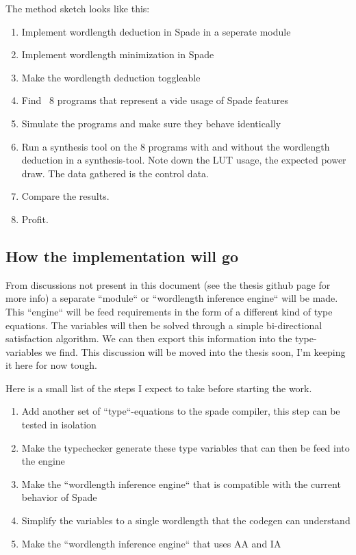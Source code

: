 \documentclass[msc,lith,english]{liuthesis}
\begin{document}
The method sketch looks like this:
\begin{enumerate}
  \item Implement wordlength deduction in Spade in a seperate module
  \item Implement wordlength minimization in Spade
  \item Make the wordlength deduction toggleable
  \item Find ~8 programs that represent a vide usage of Spade features
  \item Simulate the programs and make sure they behave identically
  \item Run a synthesis tool on the 8 programs with and without the wordlength deduction in a synthesis-tool. Note down the LUT usage, the expected power draw. The data gathered is the control data.
  \item Compare the results.
  \item Profit.
\end{enumerate}

\subsection{How the implementation will go}
From discussions not present in this document (see the thesis github page for more info) a separate ``module`` or ``wordlength inference engine`` will be made. This ``engine`` will be feed requirements in the form of a different kind of type equations. The variables will then be solved through a simple bi-directional satisfaction algorithm. We can then export this information into the type-variables we find. This discussion will be moved into the thesis soon, I'm keeping it here for now tough. 

Here is a small list of the steps I expect to take before starting the work.

\begin{enumerate}
    \item Add another set of ``type``-equations to the spade compiler, this step can be tested in isolation
    \item Make the typechecker generate these type variables that can then be feed into the engine
    \item Make the ``wordlength inference engine`` that is compatible with the current behavior of Spade
    \item Simplify the variables to a single wordlength that the codegen can understand
    \item Make the ``wordlength inference engine`` that uses AA and IA
\end{enumerate}
\end{document}
